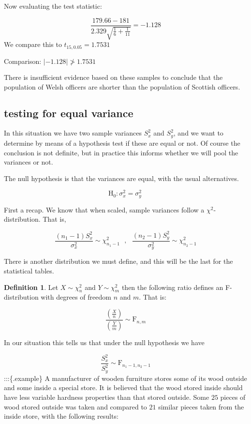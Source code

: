 \documentclass[
]{book}
\theoremstyle{definition}
\newtheorem{definition}{Definition}[chapter]
\theoremstyle{definition}
\theoremstyle{definition}
\theoremstyle{definition}
\theoremstyle{remark}
\begin{document}
Now evaluating the test statistic:

\[\frac{179.66 - 181}{2.329\sqrt{\frac{1}{6}+\frac{1}{11}}} =  -1.128\]
We compare this to \(t_{15, 0.05} = 1.7531\)

Comparison: \(|-1.128|\ngtr 1.7531\)

There is insufficient evidence based on these samples to conclude that the population of Welsh officers are shorter than the population of Scottish officers.

\hypertarget{testing-for-equal-variance}{%
\subsection{testing for equal variance}\label{testing-for-equal-variance}}

In this situation we have two sample variances \(S^2_x\) and \(S^2_y\), and we want to determine by means of a hypothesis test if these are equal or not. Of course the conclusion is not definite, but in practice this informs whether we will pool the variances or not.

The null hypothesis is that the variances are equal, with the usual alternatives.

\[\text{H}_0: \sigma^2_x = \sigma^2_y\ \]

First a recap. We know that when scaled, sample variances follow a \(\chi^2\)-distribution. That is,

\[\frac{(n_1-1)S^2_x}{\sigma^2_x}\sim \chi^2_{n_1-1} \ \ \ , \ \ \  \frac{(n_2-1)S^2_y}{\sigma^2_y}\sim \chi^2_{n_2-1}\]

There is another distribution we must define, and this will be the last for the statistical tables.

\begin{definition}
Let \(X\sim \chi^2_n\) and \(Y\sim \chi^2_m\) then the following ratio defines an F-distribution with degrees of freedom \(n\) and \(m\). That is:

\[\frac{\left(\frac{X}{n}\right)}{\left(\frac{Y}{m}\right)}\sim \text{F}_{n,m}\]
\end{definition}

In our situation this tells us that under the null hypothesis we have

\[\frac{S^2_x}{S^2_y}\sim \text{F}_{n_1 - 1,n_2-1} \]
:::\{.example\}
A manufacturer of wooden furniture stores some of its wood outside and some inside a special
store. It is believed that the wood stored inside should have less variable hardness properties than that stored outside. Some \(25\) pieces of wood stored outside was taken and compared to \(21\) similar pieces taken from the inside store, with the following results:
\end{document}
